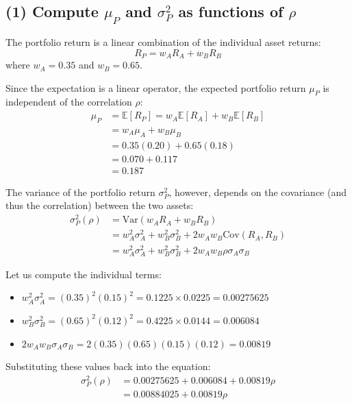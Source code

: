 \subsection*{(1) Compute $\mu_P$ and $\sigma_P^2$ as functions of $\rho$}

The portfolio return is a linear combination of the individual asset returns:
\begin{equation*}
R_P = w_A R_A + w_B R_B
\end{equation*}
where $w_A = 0.35$ and $w_B = 0.65$.

Since the expectation is a linear operator, the expected portfolio return $\mu_P$ is independent of the correlation $\rho$:
\begin{align*}
\mu_P &= \mathbb{E}[R_P] = w_A \mathbb{E}[R_A] + w_B \mathbb{E}[R_B] \\
&= w_A \mu_A + w_B \mu_B \\
&= 0.35(0.20) + 0.65(0.18) \\
&= 0.070 + 0.117 \\
&= 0.187
\end{align*}

The variance of the portfolio return $\sigma_P^2$, however, depends on the covariance (and thus the correlation) between the two assets:
\begin{align*}
\sigma_P^2(\rho) &= \text{Var}(w_A R_A + w_B R_B) \\
&= w_A^2 \sigma_A^2 + w_B^2 \sigma_B^2 + 2w_A w_B \text{Cov}(R_A, R_B) \\
&= w_A^2 \sigma_A^2 + w_B^2 \sigma_B^2 + 2w_A w_B \rho \sigma_A \sigma_B
\end{align*}

Let us compute the individual terms:
\begin{itemize}
    \item $w_A^2 \sigma_A^2 = (0.35)^2 (0.15)^2 = 0.1225 \times 0.0225 = 0.00275625$
    \item $w_B^2 \sigma_B^2 = (0.65)^2 (0.12)^2 = 0.4225 \times 0.0144 = 0.006084$
    \item $2w_A w_B \sigma_A \sigma_B = 2(0.35)(0.65)(0.15)(0.12) = 0.00819$
\end{itemize}

Substituting these values back into the equation:
\begin{align*}
\sigma_P^2(\rho) &= 0.00275625 + 0.006084 + 0.00819 \rho \\
&= 0.00884025 + 0.00819 \rho
\end{align*}


